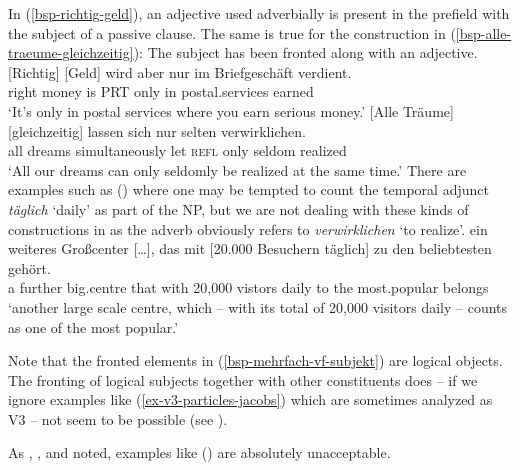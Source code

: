 In (\ref{bsp-richtig-geld}), an adjective used adverbially is present in the prefield with the subject of a passive 
clause. The same is true for the construction in (\ref{bsp-alle-traeume-gleichzeitig}):
The subject has been fronted along with an adjective.
\eal
\label{bsp-mehrfach-vf-subjekt}
\ex 
\gll {}[Richtig] [Geld] wird aber nur im Briefgeschäft verdient.\label{bsp-richtig-geld}\footnotemark\\
	 \spacebr{}right \spacebr{}money is PRT only in postal.services earned\\
\glt `It's only in postal services where you earn serious money.'
\ex 
\gll {}[Alle Träume] [gleichzeitig] lassen sich nur selten verwirklichen.\label{bsp-alle-traeume-gleichzeitig}\footnotemark\\
     \spacebr{}all dreams \spacebr{}simultaneously let \textsc{refl} only seldom realized\\
\glt `All our dreams can only seldomly be realized at the same time.'
\zl
There are examples such as () where one may be tempted to count the temporal adjunct
\emph{täglich} `daily' as part of the NP, but we are not
dealing with these kinds of constructions in  as the adverb obviously refers to \emph{verwirklichen} `to realize'.
\ea
\gll ein weiteres Großcenter [\ldots], das mit [20.000 Besuchern täglich] zu den beliebtesten gehört.\footnotemark\\
     a further big.centre    {} that with \spacebr{}20,000 vistors daily to the most.popular belongs\\
\glt `another large scale centre, which -- with its total of 20,000 visitors daily -- counts as one of the most popular.'
\z

Note that the fronted elements in (\ref{bsp-mehrfach-vf-subjekt}) are logical objects. The fronting
of logical subjects together with other constituents does -- if we ignore examples like
(\ref{ex-v3-particles-jacobs}) which are sometimes analyzed as V3 \citep{Jacobs86a} -- not seem to be possible
(see ).

As \citet[]{Lenerz86a}, \citet[]{Fanselow87a}, and \citet[]{Duerscheid89a} noted, examples like () are absolutely unacceptable.
\eal
{}
\zl

